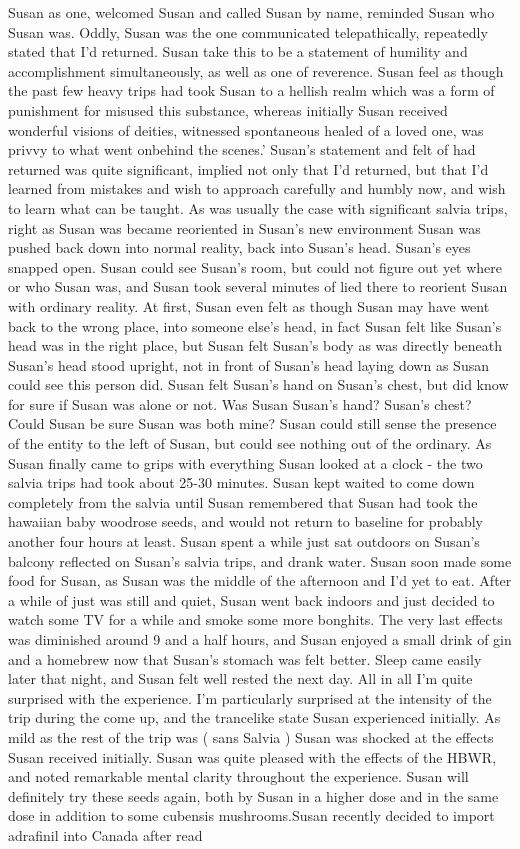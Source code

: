 \documentclass[12pt]{book}
\begin{document}
Susan as one, welcomed Susan and called Susan by name, reminded Susan who Susan was. Oddly, Susan was the one communicated telepathically, repeatedly stated that I'd returned. Susan take this to be a statement of humility and accomplishment simultaneously, as well as one of reverence. Susan feel as though the past few heavy trips had took Susan to a hellish realm which was a form of punishment for misused this substance, whereas initially Susan received wonderful visions of deities, witnessed spontaneous healed of a loved one, was privvy to what went onbehind the scenes.' Susan's statement and felt of had returned was quite significant, implied not only that I'd returned, but that I'd learned from mistakes and wish to approach carefully and humbly now, and wish to learn what can be taught. As was usually the case with significant salvia trips, right as Susan was became reoriented in Susan's new environment Susan was pushed back down into normal reality, back into Susan's head. Susan's eyes snapped open. Susan could see Susan's room, but could not figure out yet where or who Susan was, and Susan took several minutes of lied there to reorient Susan with ordinary reality. At first, Susan even felt as though Susan may have went back to the wrong place, into someone else's head, in fact Susan felt like Susan's head was in the right place, but Susan felt Susan's body as was directly beneath Susan's head stood upright, not in front of Susan's head laying down as Susan could see this person did. Susan felt Susan's hand on Susan's chest, but did know for sure if Susan was alone or not. Was Susan Susan's hand? Susan's chest? Could Susan be sure Susan was both mine? Susan could still sense the presence of the entity to the left of Susan, but could see nothing out of the ordinary. As Susan finally came to grips with everything Susan looked at a clock - the two salvia trips had took about 25-30 minutes. Susan kept waited to come down completely from the salvia until Susan remembered that Susan had took the hawaiian baby woodrose seeds, and would not return to baseline for probably another four hours at least. Susan spent a while just sat outdoors on Susan's balcony reflected on Susan's salvia trips, and drank water. Susan soon made some food for Susan, as Susan was the middle of the afternoon and I'd yet to eat. After a while of just was still and quiet, Susan went back indoors and just decided to watch some TV for a while and smoke some more bonghits. The very last effects was diminished around 9 and a half hours, and Susan enjoyed a small drink of gin and a homebrew now that Susan's stomach was felt better. Sleep came easily later that night, and Susan felt well rested the next day. All in all I'm quite surprised with the experience. I'm particularly surprised at the intensity of the trip during the come up, and the trancelike state Susan experienced initially. As mild as the rest of the trip was ( sans Salvia ) Susan was shocked at the effects Susan received initially. Susan was quite pleased with the effects of the HBWR, and noted remarkable mental clarity throughout the experience. Susan will definitely try these seeds again, both by Susan in a higher dose and in the same dose in addition to some cubensis mushrooms.Susan recently decided to import adrafinil into Canada after read 
\end{document}
